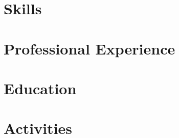 \documentclass[10pt]{article}
\begin{document}
\pagestyle{others}\thispagestyle{first_page}



\section{Skills}


\section{Professional Experience}



\section{Education}


\section{Activities}

\end{document}
